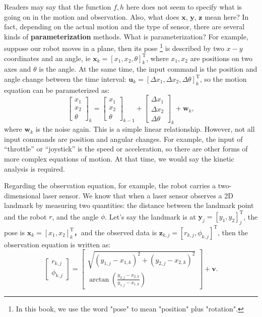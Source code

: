 Readers may say that the function $f,h$ here does not seem to specify what is going on in the motion and observation. Also, what does $\mathbf{x}$, $\mathbf{y}$, $\mathbf{z}$ mean here? In fact, depending on the actual motion and the type of sensor, there are several kinds of \textbf{parameterization} methods. What is parameterization? For example, suppose our robot moves in a plane, then its pose \footnote{ In this book, we use the word "pose" to mean "position" plus "rotation". } is described by two $x-y$ coordinates and an angle, ie $\mathbf{x}_k = [x_1,x_2,\theta]_k^\mathrm{T}$, where $x_1, x_2$ are positions on two axes and $\theta$ is the angle. At the same time, the input command is the position and angle change between the time interval: $\mathbf{u}_k = [ \Delta x_1, \Delta x_2, \Delta \theta ]_k^\mathrm{T} $, so the motion equation can be parameterized as:
\begin{equation}
{\left[ \begin{array}{l}
    x_1\\
    x_2\\
    \theta
    \end{array} \right]_k} = {\left[ \begin{array}{l}
    x_1\\
    x_2\\
    \theta
    \end{array} \right]_{k - 1}} + {\left[ \begin{array}{l}
    \Delta x_1\\
    \Delta x_2\\
    \Delta \theta
    \end{array} \right]_k} + {\mathbf{w}_k},
\end{equation}
where $\mathbf{w}_k$ is the noise again. This is a simple linear relationship. However, not all input commands are position and angular changes. For example, the input of “throttle” or “joystick” is the speed or acceleration, so there are other forms of more complex equations of motion. At that time, we would say the kinetic analysis is required.

Regarding the observation equation, for example, the robot carries a two-dimensional laser sensor. We know that when a laser sensor observes a 2D landmark by measuring two quantities: the distance between the landmark point and the robot $r$, and the angle $\phi$. Let's say the landmark is at $\mathbf{y}_j = [y_1, y_2]_j^\mathrm{T}$, the pose is $\mathbf{x}_k=[x_1,x_2]_k^\mathrm{T}$，and the observed data is $\mathbf{z}_{k,j} = [r_{k,j}, \phi_{k,j}]^\mathrm{T}$, then the observation equation is written as:
\begin{equation}
\left[ \begin{array}{l}
r_{k,j}\\
\phi_{k,j}
\end{array} \right] = \left[ \begin{array}{l}
\sqrt {{{\left(y_{1,j} - x_{1,k} \right)}^2} + {{\left( {{y_{2,j}} - x_{2,k} } \right)}^2}} \\
\arctan \left( \frac{{y_{2,j}} - x_{2,k}}{{y_{1,j} - x_{1,k}}} \right)
\end{array} \right] + \mathbf{v}.
\end{equation}

